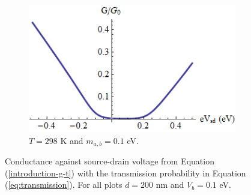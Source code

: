 \documentclass[12pt,a4paper]{report}
\begin{document}
\begin{figure}[h]
\begin{subfigure}[h]{0.3\textwidth}
				\centerline{\includegraphics[scale=0.35]{images/pot-vsd-3}}
				\caption{$T=298$ K and $m_{a,b}=0.1$ eV.}
			\end{subfigure}
			\caption{Conductance against source-drain voltage from Equation (\ref{introduction-g-t}) with the transmission probability in Equation (\ref{eq:transmission}). For all plots $d=200$ nm and $V_{b}=0.1$ eV.}
			\label{pot-vsd-1}
		\end{figure}
\end{document}
